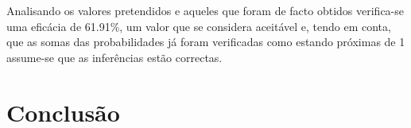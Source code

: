 \documentclass[10pt]{article}
\numberwithin{equation}{section}
\begin{document}
Analisando os valores pretendidos e aqueles que foram de facto obtidos verifica-se uma eficácia de 61.91\%, um valor que se considera aceitável e, tendo em conta, que as somas das probabilidades já foram verificadas como estando próximas de 1 assume-se que as inferências estão correctas.

\section{Conclusão}
\end{document}
